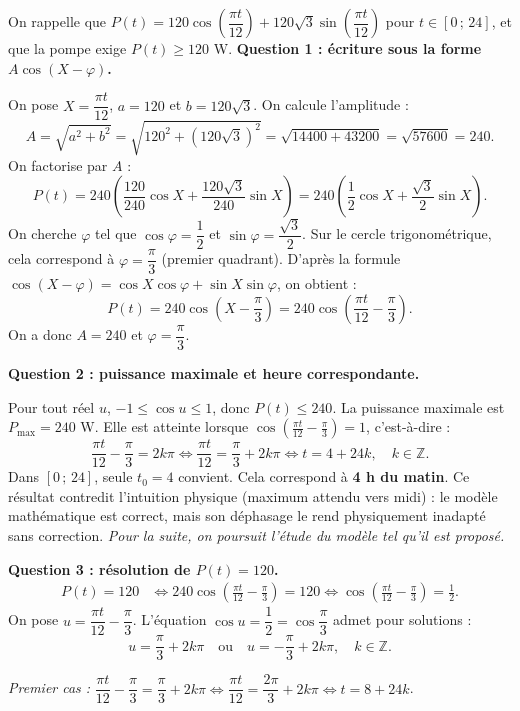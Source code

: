 \documentclass[11pt]{article}
\begin{document}
\begin{exoresolu}
On rappelle que $P(t)=120\cos\left(\dfrac{\pi t}{12}\right)+120\sqrt{3}\sin\left(\dfrac{\pi t}{12}\right)$ pour $t\in[0\,;\,24]$, et que la pompe exige $P(t)\geq 120$ W.
\tcblower
\textbf{Question 1 : écriture sous la forme $A\cos(X-\varphi)$.}

On pose $X=\dfrac{\pi t}{12}$, $a=120$ et $b=120\sqrt{3}$. On calcule l'amplitude :
\[ A=\sqrt{a^{2}+b^{2}}=\sqrt{120^{2}+\left(120\sqrt{3}\right)^{2}}=\sqrt{14400+43200}=\sqrt{57600}=240. \]
On factorise par $A$ :
\[ P(t)=240\left(\frac{120}{240}\cos X+\frac{120\sqrt{3}}{240}\sin X\right)=240\left(\frac{1}{2}\cos X+\frac{\sqrt{3}}{2}\sin X\right). \]
On cherche $\varphi$ tel que $\cos\varphi=\dfrac{1}{2}$ et $\sin\varphi=\dfrac{\sqrt{3}}{2}$. Sur le cercle trigonométrique, cela correspond à $\varphi=\dfrac{\pi}{3}$ (premier quadrant). D'après la formule $\cos(X-\varphi)=\cos X\cos\varphi+\sin X\sin\varphi$, on obtient :
\[ P(t)=240\cos\left(X-\frac{\pi}{3}\right)=240\cos\left(\frac{\pi t}{12}-\frac{\pi}{3}\right). \]
On a donc $A=240$ et $\varphi=\dfrac{\pi}{3}$.

\textbf{Question 2 : puissance maximale et heure correspondante.}

Pour tout réel $u$, $-1\leq\cos u\leq 1$, donc $P(t)\leq 240$. La puissance maximale est $P_{\max}=240$ W. Elle est atteinte lorsque $\cos\left(\frac{\pi t}{12}-\frac{\pi}{3}\right)=1$, c'est-à-dire :
\[ \frac{\pi t}{12}-\frac{\pi}{3}=2k\pi \iff \frac{\pi t}{12}=\frac{\pi}{3}+2k\pi \iff t=4+24k,\quad k\in\mathbb{Z}. \]
Dans $[0\,;\,24]$, seule $t_0=4$ convient. Cela correspond à \textbf{4 h du matin}. Ce résultat contredit l'intuition physique (maximum attendu vers midi) : le modèle mathématique est correct, mais son déphasage le rend physiquement inadapté sans correction. \emph{Pour la suite, on poursuit l'étude du modèle tel qu'il est proposé.}

\textbf{Question 3 : résolution de $P(t)=120$.}
\begin{align*}
P(t)=120 &\iff 240\cos\left(\frac{\pi t}{12}-\frac{\pi}{3}\right)=120 \iff \cos\left(\frac{\pi t}{12}-\frac{\pi}{3}\right)=\frac{1}{2}.
\end{align*}
On pose $u=\dfrac{\pi t}{12}-\dfrac{\pi}{3}$. L'équation $\cos u=\dfrac{1}{2}=\cos\dfrac{\pi}{3}$ admet pour solutions :
\[ u=\frac{\pi}{3}+2k\pi \quad\text{ou}\quad u=-\frac{\pi}{3}+2k\pi,\quad k\in\mathbb{Z}. \]

\emph{Premier cas :} $\dfrac{\pi t}{12}-\dfrac{\pi}{3}=\dfrac{\pi}{3}+2k\pi \iff \dfrac{\pi t}{12}=\dfrac{2\pi}{3}+2k\pi \iff t=8+24k$.


\end{exoresolu}
\end{document}
